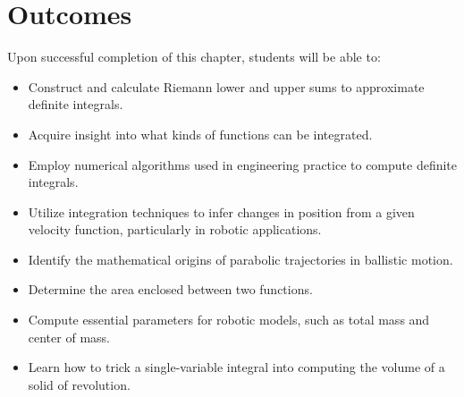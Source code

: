 \section*{Outcomes}
Upon successful completion of this chapter, students will be able to:
\begin{itemize}
\item Construct and calculate Riemann lower and upper sums to approximate definite integrals.
\item  Acquire insight into what kinds of functions can be integrated.
\item Employ numerical algorithms used in engineering practice to compute definite integrals.
\item Utilize integration techniques to infer changes in position from a given velocity function, particularly in robotic applications.
\item Identify the mathematical origins of parabolic trajectories in ballistic motion.
\item Determine the area enclosed between two functions.
\item Compute essential parameters for robotic models, such as total mass and center of mass.
\item  Learn how to trick a single-variable integral into computing the volume of a solid of revolution.
\end{itemize}


